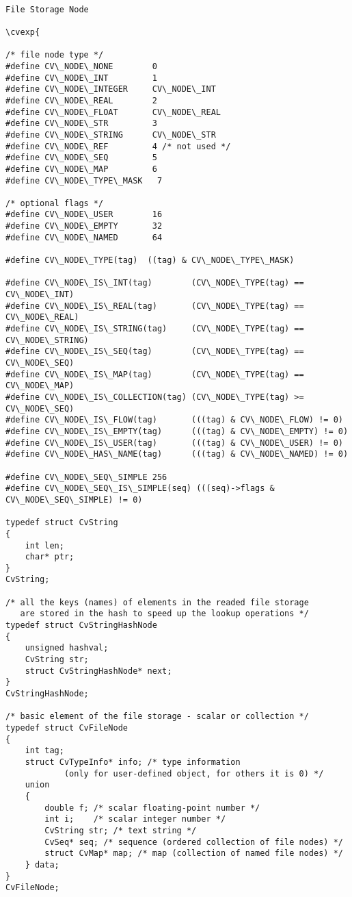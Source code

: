 \begin{verbatim}

File Storage Node

\cvexp{

/* file node type */
#define CV\_NODE\_NONE        0
#define CV\_NODE\_INT         1
#define CV\_NODE\_INTEGER     CV\_NODE\_INT
#define CV\_NODE\_REAL        2
#define CV\_NODE\_FLOAT       CV\_NODE\_REAL
#define CV\_NODE\_STR         3
#define CV\_NODE\_STRING      CV\_NODE\_STR
#define CV\_NODE\_REF         4 /* not used */
#define CV\_NODE\_SEQ         5
#define CV\_NODE\_MAP         6
#define CV\_NODE\_TYPE\_MASK   7

/* optional flags */
#define CV\_NODE\_USER        16
#define CV\_NODE\_EMPTY       32
#define CV\_NODE\_NAMED       64

#define CV\_NODE\_TYPE(tag)  ((tag) & CV\_NODE\_TYPE\_MASK)

#define CV\_NODE\_IS\_INT(tag)        (CV\_NODE\_TYPE(tag) == CV\_NODE\_INT)
#define CV\_NODE\_IS\_REAL(tag)       (CV\_NODE\_TYPE(tag) == CV\_NODE\_REAL)
#define CV\_NODE\_IS\_STRING(tag)     (CV\_NODE\_TYPE(tag) == CV\_NODE\_STRING)
#define CV\_NODE\_IS\_SEQ(tag)        (CV\_NODE\_TYPE(tag) == CV\_NODE\_SEQ)
#define CV\_NODE\_IS\_MAP(tag)        (CV\_NODE\_TYPE(tag) == CV\_NODE\_MAP)
#define CV\_NODE\_IS\_COLLECTION(tag) (CV\_NODE\_TYPE(tag) >= CV\_NODE\_SEQ)
#define CV\_NODE\_IS\_FLOW(tag)       (((tag) & CV\_NODE\_FLOW) != 0)
#define CV\_NODE\_IS\_EMPTY(tag)      (((tag) & CV\_NODE\_EMPTY) != 0)
#define CV\_NODE\_IS\_USER(tag)       (((tag) & CV\_NODE\_USER) != 0)
#define CV\_NODE\_HAS\_NAME(tag)      (((tag) & CV\_NODE\_NAMED) != 0)

#define CV\_NODE\_SEQ\_SIMPLE 256
#define CV\_NODE\_SEQ\_IS\_SIMPLE(seq) (((seq)->flags & CV\_NODE\_SEQ\_SIMPLE) != 0)

typedef struct CvString
{
    int len;
    char* ptr;
}
CvString;

/* all the keys (names) of elements in the readed file storage
   are stored in the hash to speed up the lookup operations */
typedef struct CvStringHashNode
{
    unsigned hashval;
    CvString str;
    struct CvStringHashNode* next;
}
CvStringHashNode;

/* basic element of the file storage - scalar or collection */
typedef struct CvFileNode
{
    int tag;
    struct CvTypeInfo* info; /* type information
            (only for user-defined object, for others it is 0) */
    union
    {
        double f; /* scalar floating-point number */
        int i;    /* scalar integer number */
        CvString str; /* text string */
        CvSeq* seq; /* sequence (ordered collection of file nodes) */
        struct CvMap* map; /* map (collection of named file nodes) */
    } data;
}
CvFileNode;


\end{verbatim}
